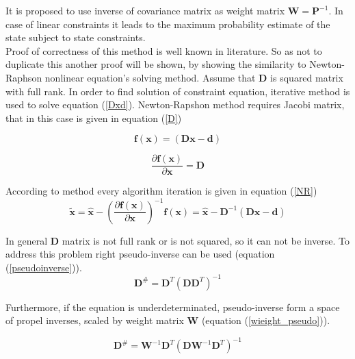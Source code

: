 It is proposed to use inverse of covariance matrix as weight matrix  $\bm{W} = \bm{P}^{-1}$. In case of linear constraints it leads to the maximum probability
estimate of the state subject to state constraints.\\

Proof of correctness of this method is well known in literature. So as not to duplicate this another proof will be shown, by showing the similarity to Newton-Raphson nonlinear equation's solving method. Assume that $\bm{D}$ is squared matrix with full rank. In order to find solution of constraint equation, iterative method is used to solve equation (\ref{Dxd}). Newton-Rapshon method requires Jacobi matrix, that in this case is given in equation (\ref{D})

\begin{equation}
	\bm{f} \left( \bm{x} \right) = \left( \bm{D} \bm{x} - \bm{d}  \right)
	\label{Dxd}
\end{equation}

\begin{equation}
	\frac{\partial \bm{f} \left( \bm{x} \right)}{\partial \bm{x}} = \bm{D}
	\label{D}
\end{equation}

According to method every algorithm iteration is given in equation (\ref{NR})
\begin{equation}
	\bm{\tilde{x}} = \bm{\hat{x}} - \left( \frac{\partial \bm{f} \left( \bm{x} \right)}{\partial \bm{x}} \right) ^{-1} \bm{f} \left( \bm{x} \right) = \bm{\hat{x}} - \bm{D}^{-1} \left( \bm{D} \bm{\hat{x}} - \bm{d}  \right)
	\label{NR}
\end{equation}

In general $\bm{D}$ matrix is not full rank or is not squared, so it can not be inverse. To address this problem right pseudo-inverse can be used (equation (\ref{pseudoinverse})).
\begin{equation}
	\bm{D}^{\#} = \bm{D}^T \left( \bm{D} \bm{D}^T \right) ^ {-1}
	\label{pseudoinverse}
\end{equation}

Furthermore, if the equation is underdeterminated, pseudo-inverse form a space of propel inverses, scaled by weight matrix $\bm{W}$ (equation (\ref{wieight_pseudo})).

\begin{equation}
	\bm{D}^{\#} = \bm{W}^{-1} \bm{D}^T \left( \bm{D} \bm{W}^{-1} \bm{D}^T \right) ^ {-1}
	\label{wieight_pseudo}
\end{equation}

